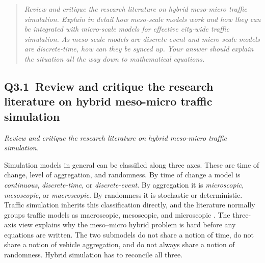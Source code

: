 \begin{bibunit}[plainnat]
\begin{quote}\itshape
Review and critique the research literature on hybrid meso-micro traffic simulation.
Explain in detail how meso-scale models work and how they can be integrated with micro-scale models for effective city-wide traffic simulation.
As meso-scale models are discrete-event and micro-scale models are discrete-time, how can they be synced up.
Your answer should explain the situation all the way down to mathematical equations.
\end{quote}

\subsection{Q3.1\ Review and critique the research literature on hybrid meso-micro traffic simulation}

\textit{Review and critique the research literature on hybrid meso-micro traffic simulation.}

Simulation models in general can be classified along three axes. These are time of change, level of aggregation, and randomness. By time of change a model is \textit{continuous}, \textit{discrete-time}, or \textit{discrete-event}. By aggregation it is \textit{microscopic}, \textit{mesoscopic}, or \textit{macroscopic}. By randomness it is stochastic or deterministic. Traffic simulation inherits this classification directly, and the literature normally groups traffic models as macroscopic, mesoscopic, and microscopic \citep{burghout2004thesis}. The three-axis view explains why the meso--micro hybrid problem is hard before any equations are written. The two submodels do not share a notion of time, do not share a notion of vehicle aggregation, and do not always share a notion of randomness. Hybrid simulation has to reconcile all three.


\end{bibunit}
